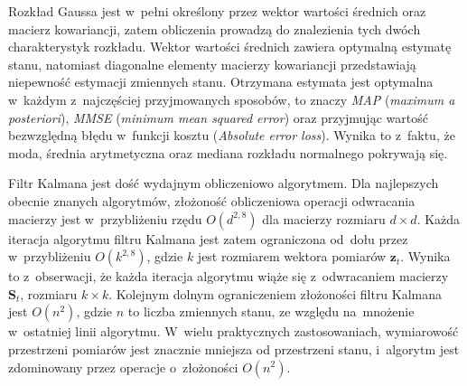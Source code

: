 \par
Rozkład Gaussa jest w~pełni określony przez wektor wartości średnich oraz macierz kowariancji, zatem obliczenia prowadzą do znalezienia tych dwóch charakterystyk rozkładu. Wektor wartości średnich zawiera optymalną estymatę stanu, natomiast diagonalne elementy macierzy kowariancji przedstawiają niepewność estymacji zmiennych stanu. Otrzymana estymata jest optymalna w~każdym z~najczęściej przyjmowanych sposobów, to znaczy \textit{MAP} (\textit{maximum a posteriori}), \textit{MMSE} (\textit{minimum mean squared error}) oraz przyjmując wartość bezwzględną błędu w~funkcji kosztu (\textit{Absolute error loss}). Wynika to z~faktu, że moda, średnia arytmetyczna oraz mediana rozkładu normalnego pokrywają się. 
\par
Filtr Kalmana jest dość wydajnym obliczeniowo algorytmem. Dla najlepszych obecnie znanych algorytmów, złożoność obliczeniowa operacji odwracania macierzy jest w~przybliżeniu rzędu $O(d^{2,8})$ dla macierzy rozmiaru $d \times d$. Każda iteracja algorytmu filtru Kalmana jest zatem ograniczona od~dołu przez w~przybliżeniu $O(k^{2,8})$, gdzie $k$ jest rozmiarem wektora pomiarów $\mathbf{z}_t$. Wynika to z~obserwacji, że każda iteracja algorytmu wiąże się z~odwracaniem macierzy $\mathbf{S}_t$, rozmiaru $k \times k$. Kolejnym dolnym ograniczeniem złożoności filtru Kalmana jest $O(n^2)$, gdzie $n$ to liczba zmiennych stanu, ze względu na~mnożenie w~ostatniej linii algorytmu. W~wielu praktycznych zastosowaniach, wymiarowość przestrzeni pomiarów jest znacznie mniejsza od przestrzeni stanu, i~algorytm jest zdominowany przez operacje o~złożoności $O(n^2)$.
